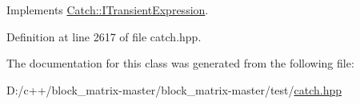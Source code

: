 Implements \mbox{\hyperlink{struct_catch_1_1_i_transient_expression_aabe1889df9c6e639a24afb08d8a0fe9e}{Catch\+::\+I\+Transient\+Expression}}.



Definition at line 2617 of file catch.\+hpp.



The documentation for this class was generated from the following file\+:\begin{DoxyCompactItemize}
\item 
D\+:/c++/block\+\_\+matrix-\/master/block\+\_\+matrix-\/master/test/\mbox{\hyperlink{catch_8hpp}{catch.\+hpp}}\end{DoxyCompactItemize}

